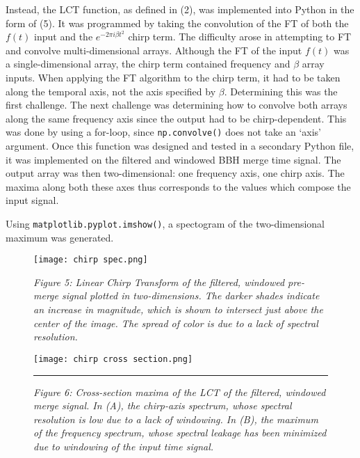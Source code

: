 \documentclass[12pt]{article}
\begin{document}
\begin{multicols}{2}
Instead, the LCT function, as defined in (2), was implemented into Python in the form of (5). It was programmed by taking the convolution of the FT of both the $f(t)$ input and the $e^{-2\pi i \beta t^2}$ chirp term. The difficulty arose in attempting to FT and convolve multi-dimensional arrays. Although the FT of the input $f(t)$ was a single-dimensional array, the chirp term contained frequency and $\beta$ array inputs. When applying the FT algorithm to the chirp term, it had to be taken along the temporal axis, not the axis specified by $\beta$. Determining this was the first challenge. The next challenge was determining how to convolve both arrays along the same frequency axis since the output had to be chirp-dependent. This was done by using a for-loop, since \verb!np.convolve()! does not take an `axis' argument. Once this function was designed and tested in a secondary Python file, it was implemented on the filtered and windowed BBH merge time signal. The output array was then two-dimensional: one frequency axis, one chirp axis. The maxima along both these axes thus corresponds to the values which compose the input signal.

Using \verb!matplotlib.pyplot.imshow()!, a spectogram of the two-dimensional maximum was generated.

\begin{figure}[H]
    \centering
    \texttt{[image: chirp spec.png]}
    \caption*{\textit{Figure 5: Linear Chirp Transform of the filtered, windowed pre-merge signal plotted in two-dimensions. The darker shades indicate an increase in magnitude, which is shown to intersect just above the center of the image. The spread of color is due to a lack of spectral resolution.}}
\end{figure}



\begin{figure*}[!t]
    \centering
    \hspace{-320pt}
    \begin{minipage}{0.3\linewidth}
        \texttt{[image: chirp cross section.png]}
    \end{minipage}\rule{0.5em}{0pt}%
    \caption*{\textit{Figure 6: Cross-section maxima of the LCT of the filtered, windowed merge signal. In (A), the chirp-axis spectrum, whose spectral resolution is low due to a lack of windowing. In (B), the maximum of the frequency spectrum, whose spectral leakage has been minimized due to windowing of the input time signal.}}
\nd \hrulefill  
\end{figure*}


\end{multicols}
\end{document}
